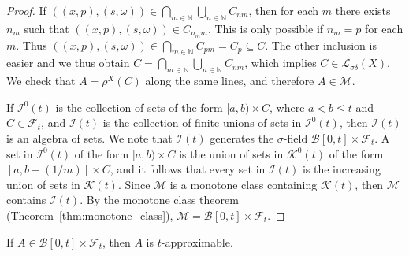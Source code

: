 \begin{proof}
  If $((x,p),(s,\omega)) \in \bigcap_{m \in \mathbb{N}} \bigcup_{n \in \mathbb{N}} C_{nm}$, then
  for each $m$ there exists $n_m$ such that $((x,p),(s,\omega)) \in C_{n_mm}$.
  This is
  only possible if $n_m = p$ for each $m$. Thus $((x,p), (s, \omega)) \in \bigcap_{m \in \mathbb{N}} C_{pm} = C_p \subseteq C$.
  The other inclusion is easier and we thus obtain $C = \bigcap_{m \in \mathbb{N}}\bigcup_{n \in \mathbb{N}} C_{nm}$,
  which implies $C \in \mathcal{L}_{\sigma\delta}(X)$. We check that
  $A = \rho^X(C)$ along the same lines, and therefore $A \in \mathcal{M}$.


  If $\mathcal{I}^0(t)$ is the collection of sets of the form $[a,b) \times C$, where
  $a < b \leq t$ and $C \in \mathcal{F}_t$, and $\mathcal{I}(t)$ is the collection of finite
  unions of sets in $\mathcal{I}^0(t)$, then $\mathcal{I}(t)$ is an algebra of sets. We
  note that $\mathcal{I}(t)$ generates the $\sigma$-field $\mathcal{B}[0,t] \times \mathcal{F}_t$. A set
  in $\mathcal{I}^0(t)$ of the form $[a,b) \times C$ is the union of sets in $\mathcal{K}^0(t)$
  of the form $[a, b-(1/m)] \times C$, and it
  follows that every set in $\mathcal{I}(t)$ is the increasing union of sets
  in $\mathcal{K}(t)$. Since $\mathcal{M}$ is a monotone
  class containing $\mathcal{K}(t)$, then $\mathcal{M}$ contains $\mathcal{I}(t)$.
  By the monotone class theorem (Theorem~\ref{thm:monotone_class}), $\mathcal{M} = \mathcal{B}[0,t] \times \mathcal{F}_t$.
\end{proof}

\begin{lemma}\label{lem:t_approx_of_Borel_measurable}
  \leanok
If $A \in \mathcal{B}[0, t] \times \mathcal{F}_t$, then $A$ is $t$-approximable.
\end{lemma}

